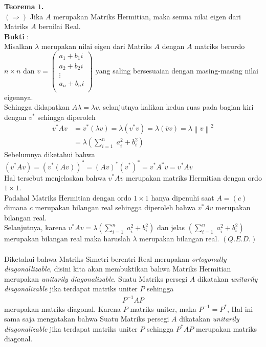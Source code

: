 \documentclass[11pt,a4paper]{article}
\newcommand{\ds}{\displaystyle}
\theoremstyle{plain}
\theoremstyle{definition}
\theoremstyle{remark}
\begin{document}
\begin{enumerate}
	\textbf{Teorema $1$.}\\
	$(\Rightarrow)$
	Jika $A$ merupakan Matriks Hermitian, maka semua nilai eigen dari Matriks $A$ bernilai Real.\\
	\textbf{Bukti} :\\
	Misalkan $\lambda$ merupakan nilai eigen dari Matriks $A$ dengan $A$ matriks berordo $n\times n$ dan $v=\begin{pmatrix}
	a_{1}+b_{1}i \\
	a_{2}+b_{2}i \\
	\vdots		 \\	
	a_{n}+b_{n}i \\ 
	\end{pmatrix}$ yang saling bersesuaian dengan masing-masing nilai eigennya.\\
	Sehingga didapatkan $A\lambda = \lambda v$, selanjutnya kalikan kedua ruas pada bagian kiri dengan $v^*$ sehingga diperoleh
	\begin{align*}
	v^*Av &=v^*(\lambda v)=\lambda (v^*v)= \lambda (\overline{v}v) = \lambda \left\|v\right\|^{2} \\
	&=\ds \lambda \left(\sum_{i=1}^{n}\; a_{i}^{2}+b_{i}^{2}\right) 
	\end{align*}
	Sebelumnya diketahui bahwa $(v^{*}Av)=(v^{*}(Av))^*=(Av)^*(v^*)^*=v^*A^*v=v^*Av$\\
	Hal tersebut menjelaskan bahwa $v^*Av$ merupakan matriks Hermitian dengan ordo $1\times 1$.\\
	Padahal Matriks Hermitian dengan ordo $1\times 1$ hanya dipenuhi saat $A=(c)$ dimana $c$ merupakan bilangan real sehingga diperoleh bahwa $v^*Av$ merupakan bilangan real.\\
	Selanjutnya, karena $v^*Av=\displaystyle \lambda \left(\sum_{i=1}^{n}\; a_{i}^{2}+b_{i}^{2}\right)$ dan jelas $\displaystyle \left(\sum_{i=1}^{n}\; a_{i}^{2}+b_{i}^{2}\right)$ merupakan bilangan real maka haruslah $\lambda$ merupakan bilangan real. $(Q.E.D.)$\\
	\\
	\hspace*{0.5cm} Diketahui bahwa Matriks Simetri berentri Real merupakan \textit{ortogonally diagonallizable}, disini kita akan membuktikan bahwa Matriks Hermitian merupakan \textit{unitarily diagonalizable}. Suatu Matriks persegi $A$ dikatakan \textit{unitarily diagonalizable} jika terdapat matriks uniter $P$ sehingga
	\begin{align*}
	P^{-1}AP
	\end{align*}
	merupakan matriks diagonal. Karena $P$ matriks uniter, maka $P^{-1}=P^*$, Hal ini sama saja mengatakan bahwa Suatu Matriks persegi $A$ dikatakan \textit{unitarily diagonalizable} jika terdapat matriks uniter $P$ sehingga $P^*AP$ merupakan matriks diagonal.\\

\end{enumerate}
\end{document}
